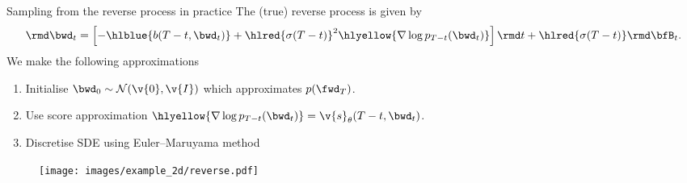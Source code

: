 \begin{frame}{Sampling from the reverse process in practice}
The (true) reverse process is given by
\begin{equation*}
  \rmd \bwd_t = \left[ -\hlblue{b(T-t,\bwd_t)} + \hlred{\sigma(T-t)}^2 \hlyellow{\nabla \log p_{T-t}(\bwd_t)}\right] \rmd t + \hlred{\sigma(T-t)} \rmd \bfB_t.
\end{equation*}
We make the following approximations
\begin{enumerate}
    \item Initialise $\bwd_0 \sim \mathcal{N}(\v{0},\v{I})$ which approximates $p(\fwd_{T})$.
    \item Use score approximation $\hlyellow{\nabla \log p_{T-t}(\bwd_t)} = \v{s}_\theta(T - t, \bwd_t)$.
    \item Discretise SDE using Euler–Maruyama method
\end{enumerate}
\begin{figure}
\centering
\texttt{[image: images/example\_2d/reverse.pdf]}
\end{figure}
\end{frame}

